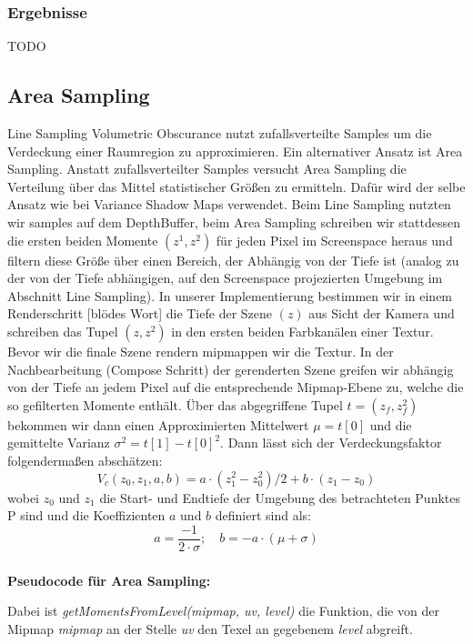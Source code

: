 \documentclass[runningheaders,a4paper]{llncs}
\begin{document}
\subsubsection{Ergebnisse}
TODO

\subsection{Area Sampling}
Line Sampling Volumetric Obscurance nutzt zufallsverteilte Samples um die Verdeckung einer
Raumregion zu approximieren. Ein alternativer Ansatz ist Area Sampling. Anstatt zufallsverteilter Samples
versucht Area Sampling die Verteilung über das Mittel statistischer Größen zu ermitteln. Dafür
wird der selbe Ansatz wie bei Variance Shadow Maps \cite{vsmPaper} verwendet. Beim Line Sampling
nutzten wir samples auf dem DepthBuffer, beim Area Sampling schreiben wir stattdessen die ersten beiden
Momente $(z^1, z^2)$ für jeden Pixel im Screenspace heraus und filtern diese Größe über einen Bereich, der
Abhängig von der Tiefe ist (analog zu der von der Tiefe abhängigen, auf den Screenspace projezierten Umgebung
im Abschnitt Line Sampling). In unserer Implementierung bestimmen wir in einem Renderschritt [blödes Wort]
die Tiefe der Szene $(z)$ aus Sicht der Kamera und schreiben das Tupel $(z, z^2)$ in den ersten beiden
Farbkanälen einer Textur. Bevor wir die finale Szene rendern mipmappen wir die Textur.
In der Nachbearbeitung (Compose Schritt) der gerenderten Szene greifen wir abhängig von der Tiefe an jedem
Pixel auf die entsprechende Mipmap-Ebene zu, welche die so gefilterten Momente enthält.
Über das abgegriffene Tupel $t = (z_f, z_f^2)$ bekommen wir dann einen Approximierten Mittelwert 
$\mu = t[0]$ und die gemittelte Varianz $\sigma^2 = t[1] - t[0]^2$. Dann lässt sich der Verdeckungsfaktor 
folgendermaßen abschätzen:
$$
V_c(z_0, z_1, a, b) = a\cdot(z_1^2 - z_0^2) / 2 + b \cdot (z_1 - z_0)
$$
wobei $z_0$ und $z_1$ die Start- und Endtiefe der Umgebung des betrachteten Punktes P sind und die 
Koeffizienten $a$ und $b$ definiert sind als:
$$
a = \frac{-1}{2 \cdot \sigma}; \quad b = -a \cdot (\mu + \sigma)
$$

\subsubsection{} \textbf{Pseudocode für Area Sampling:} \\
\begin{algorithm}[H]
\end{algorithm}
Dabei ist \textit{getMomentsFromLevel(mipmap, uv, level)} die Funktion, die von der Mipmap \textit{mipmap}
an der Stelle \textit{uv} den Texel an gegebenem \textit{level} abgreift. 
\end{document}

